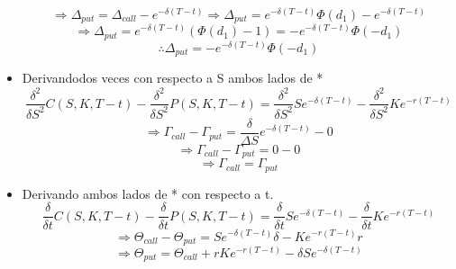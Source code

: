 \documentclass[12pts]{extarticle}
\begin{document}
\begin{itemize}
$$\Rightarrow \Delta_{put}=\Delta_{call}-e^{-\delta(T-t)} \Rightarrow \Delta_{put}=e^{-\delta (T-t)}\Phi(d_1)-e^{-\delta(T-t)}$$
$$\Rightarrow \Delta_{put}=e^{-\delta (T-t)}(\Phi(d_1)-1)=-e^{-\delta(T-t)}\Phi(-d_1)$$
$$\therefore \Delta_{put}=-e^{-\delta(T-t)}\Phi(-d_1)$$
\item Derivandodos veces con respecto a S ambos lados de *
$$\frac{\delta^2}{\delta S^2}C(S,K,T-t)-\frac{\delta^2}{\delta S^2}P(S,K,T-t)=\frac{\delta^2}{\delta S^2}Se^{-\delta(T-t)}-\frac{\delta^2}{\delta S^2}Ke^{-r(T-t)}$$
$$\Rightarrow \Gamma_{call}-\Gamma_{put}=\frac{\delta}{\Delta S}e^{-\delta(T-t)}-0$$
$$\Rightarrow \Gamma_{call}-\Gamma_{put}=0-0$$
$$\Rightarrow \Gamma_{call}=\Gamma_{put}$$
\item Derivando ambos lados de * con respecto a t.
$$\frac{\delta}{\delta t}C(S,K,T-t)-\frac{\delta}{\delta t}P(S,K,T-t)=\frac{\delta}{\delta t}Se^{-\delta(T-t)}-\frac{\delta}{\delta t}Ke^{-r(T-t)}$$
$$\Rightarrow \Theta_{call}- \Theta_{put}=Se^{-\delta(T-t)}\delta-Ke^{-r(T-t)}r$$
$$\Rightarrow \Theta_{put}=\Theta_{call}+rKe^{-r(T-t)}-\delta Se^{-\delta(T-t)}$$


\end{itemize}
\end{document}
